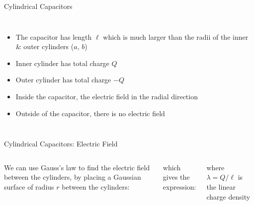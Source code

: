 \documentclass[12pt,aspectratio=169]{beamer}
\begin{document}
\begin{frame}{Cylindrical Capacitors}
\begin{columns}
    \begin{itemize}
    \item The capacitor has length $\ell$ which is much larger than the radii
      of the inner \& outer cylinders ($a$, $b$)
    \item Inner cylinder has total charge $Q$
    \item Outer cylinder has total charge $-Q$
    \item Inside the capacitor, the electric field in the radial direction
    \item Outside of the capacitor, there is no electric field
    \end{itemize}
  \end{columns}
\end{frame}



\begin{frame}{Cylindrical Capacitors: Electric Field}
  \begin{columns}

    We can use Gauss's law to find the electric field between the cylinders, by
    placing a Gaussian surface of radius $r$ between the cylinders: 

    
    which gives the expression:

    
    where $\lambda=Q/\ell$ is the linear charge density
  \end{columns}
\end{frame}
\end{document}
